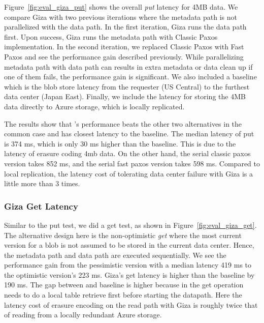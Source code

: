 Figure~\ref{fig:eval_giza_put} shows the \name overall {\em put} latency for 4MB data. We compare Giza with two previous iterations where the metadata path is not parallelized with the data path. In the first iteration, Giza runs the data path first. Upon success, Giza runs the metadata path with Classic Paxos implementation. In the second iteration, we replaced Classic Paxos with Fast Paxos and see the performance gain described previously. While parallelizing metadata path with data path can results in extra metadata or data clean up if one of them fails, the performance gain is significant. We also included a baseline which is the blob store latency from the requester (US Central) to the furthest data center (Japan East). Finally, we include the latency for storing the 4MB data directly to Azure storage, which is locally replicated.

The results show that \name's performance beats the other two alternatives in the common case and has closest
latency to the baseline. The median latency of \name put is 374 ms, which is only 30 ms
higher than the baseline. This is due to the latency of erasure coding 4mb data. On the other hand, the serial classic paxos version takes 
852 ms, and the serial fast paxos version takes 598 ms. Compared to local replication, the latency cost of tolerating data center failure with Giza is a little more than 3 times.

\subsubsection{Giza Get Latency}

Similar to the put test, we did a \name get test, as shown in Figure~\ref{fig:eval_giza_get}. The alternative design here is the non-optimistic {\em get } where the most current version for a blob is not assumed to be stored in the current data center. Hence, the metadata path and data path are executed sequentially. We see the performance gain from the pessimistic version with a median latency 419 ms to the optimistic version's 223 ms. Giza's get latency is higher than the baseline by 190 ms. The gap between \name and baseline is higher because in the get operation \name needs to do a local table retrieve first before starting the datapath. Here the latency cost of erasure encoding on the read path with Giza is roughly twice that of reading from a locally redundant Azure storage.




